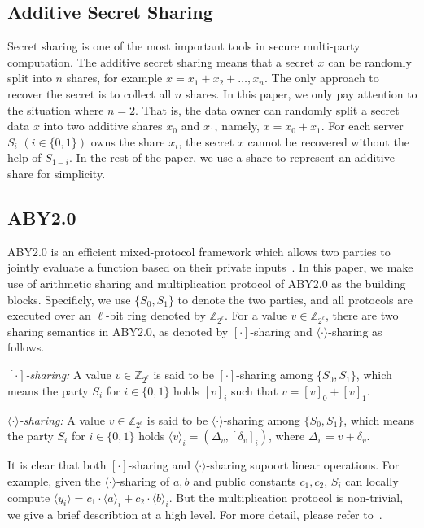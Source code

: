 \documentclass[conference]{IEEEtran}
\begin{document}
\subsection{Additive Secret Sharing}
Secret sharing is one of the most important tools in secure multi-party computation.
The additive secret sharing means that a secret $x$ can be randomly split into $n$ shares, for example $x = x_1 + x_2 + \ldots, x_n$.
The only approach to recover the secret is to collect all $n$ shares.
In this paper, we only pay attention to the situation where $n=2$.
That is, the data owner can randomly split a secret data $x$ into two additive shares $x_0$ and $x_1$, namely, $x = x_0 + x_1$.
For each server $S_i$ $(i\in\{0,1\})$ owns the share $x_i$, the secret $x$ cannot be recovered without the help of $S_{1-i}$.
In the rest of the paper, we use a share to represent an additive share for simplicity.

\iffalse
\subsection{ABY2.0}
ABY2.0 is an efficient mixed-protocol framework which allows two parties to jointly evaluate a function based on their private inputs~\cite{patra_aby20_2020}.
In this paper, we make use of arithmetic sharing and multiplication protocol of ABY2.0 as the building blocks.
Specificly, we use $\{S_0, S_1\}$ to denote the two parties, and all protocols are executed over an $\ell$-bit ring denoted by $\mathbb{Z}_{2^\ell}$.
For a value $v\in\mathbb{Z}_{2^\ell}$, there are two sharing semantics in ABY2.0, as denoted by $[\cdot]$-sharing and $\langle \cdot \rangle$-sharing as follows.

\textit{$[\cdot]$-sharing:} A value $v\in\mathbb{Z}_{2^\ell}$ is said to be $[\cdot]$-sharing among $\{S_0, S_1\}$, which means the party $S_i$ for $i\in\{0,1\}$ holds $[v]_i$ such that $v = [v]_0 + [v]_1$.

\textit{$\langle \cdot \rangle$-sharing:} A value $v\in\mathbb{Z}_{2^\ell}$ is said to be $\langle \cdot \rangle$-sharing among $\{S_0, S_1\}$, which means the party $S_i$ for $i\in\{0,1\}$ holds $\langle v \rangle_i = (\Delta_v, [\delta_v]_i)$, where $\Delta_v = v + \delta_v$.

It is clear that both $[\cdot]$-sharing and $\langle \cdot \rangle$-sharing supoort linear operations.
For example, given the $\langle \cdot \rangle$-sharing of $a,b$ and public constants $c_1,c_2$, $S_i$ can locally compute $\langle y_i \rangle = c_1 \cdot \langle a \rangle_i + c_2 \cdot \langle b \rangle_i$.
But the multiplication protocol is non-trivial, we give a brief describtion at a high level.
For more detail, please refer to~\cite{patra_aby20_2020}.
\end{document}
